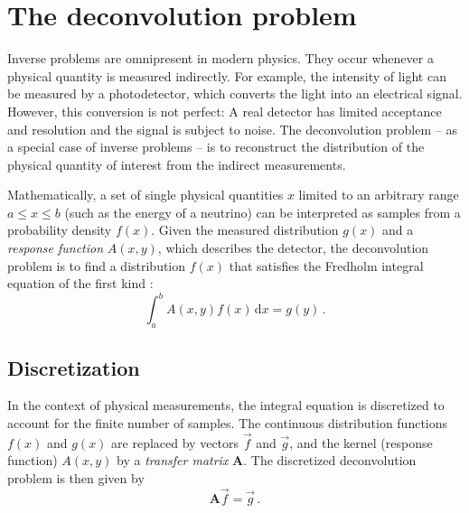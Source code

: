 \section{The deconvolution problem} %
Inverse problems are omnipresent in modern physics.
They occur whenever a physical quantity is measured indirectly.
For example,
the intensity of light can be measured by a photodetector,
  which converts the light into an electrical signal.
However,
this conversion is not perfect:
A real detector has limited acceptance and resolution
and the signal is subject to noise.
%
The deconvolution problem
  – as a special case of inverse problems –
  is to reconstruct
    the distribution of the physical quantity of interest
    from the indirect measurements.

Mathematically,
a set of single physical quantities $x$
  limited to an arbitrary range $a \leq x \leq b$
    (such as the energy of a neutrino)
can be interpreted as samples from a probability density $f(x)$.
%
Given
  the measured distribution $g(x)$
  and a \emph{response function} $A(x, y)$,
    which describes the detector,
the deconvolution problem is
  to find a distribution $f(x)$ that satisfies
  the Fredholm integral equation of the first kind \cite{deconvolution_blobel}:
\begin{equation}
  \label{eq:deconvolution_problem:fredholm}
  \int_a^b A(x, y) f(x) \, \mathrm{d}x = g(y) \, .
\end{equation}


\subsection{Discretization} \label{sec:dsea:deconvolution_problem:discretization}
In the context of physical measurements,
the integral equation is discretized
  to account for the finite number of samples.
The continuous distribution functions $f(x)$ and $g(x)$ are replaced by vectors $\vec{f}$ and $\vec{g}$,
and the kernel (response function) $A(x, y)$ by a \emph{transfer matrix} $\symbf{A}$.
%
The discretized deconvolution problem is then given by
\begin{equation}
  \label{eq:deconvolution_problem:discretized}
  \symbf{A} \vec{f} = \vec{g} \, .
\end{equation}

